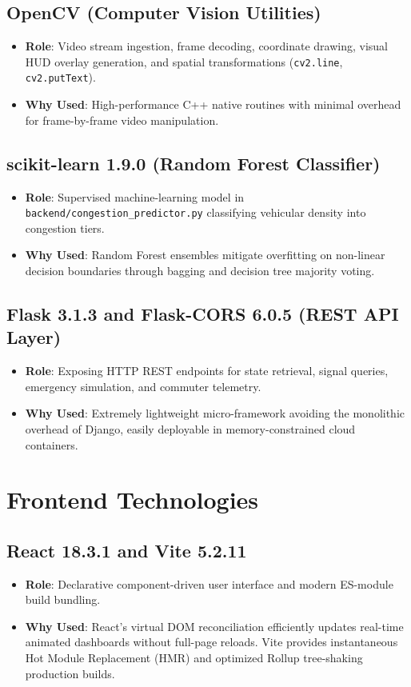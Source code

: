 \subsection{OpenCV (Computer Vision Utilities)}
\begin{itemize}[leftmargin=*]
    \item \textbf{Role}: Video stream ingestion, frame decoding, coordinate drawing, visual HUD overlay generation, and spatial transformations (\texttt{cv2.line}, \texttt{cv2.putText}).
    \item \textbf{Why Used}: High-performance C++ native routines with minimal overhead for frame-by-frame video manipulation.
\end{itemize}

\subsection{scikit-learn 1.9.0 (Random Forest Classifier)}
\begin{itemize}[leftmargin=*]
    \item \textbf{Role}: Supervised machine-learning model in \texttt{backend/congestion\_predictor.py} classifying vehicular density into congestion tiers.
    \item \textbf{Why Used}: Random Forest ensembles mitigate overfitting on non-linear decision boundaries through bagging and decision tree majority voting.
\end{itemize}

\subsection{Flask 3.1.3 and Flask-CORS 6.0.5 (REST API Layer)}
\begin{itemize}[leftmargin=*]
    \item \textbf{Role}: Exposing HTTP REST endpoints for state retrieval, signal queries, emergency simulation, and commuter telemetry.
    \item \textbf{Why Used}: Extremely lightweight micro-framework avoiding the monolithic overhead of Django, easily deployable in memory-constrained cloud containers.
\end{itemize}

\section{Frontend Technologies}

\subsection{React 18.3.1 and Vite 5.2.11}
\begin{itemize}[leftmargin=*]
    \item \textbf{Role}: Declarative component-driven user interface and modern ES-module build bundling.
    \item \textbf{Why Used}: React's virtual DOM reconciliation efficiently updates real-time animated dashboards without full-page reloads. Vite provides instantaneous Hot Module Replacement (HMR) and optimized Rollup tree-shaking production builds.
\end{itemize}

